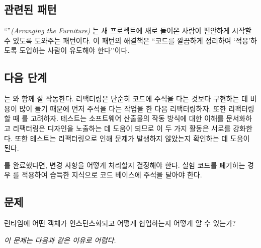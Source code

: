\documentclass[a4paper,10pt,twoside]{book}
\begin{document}
\subsection*{관련된 패턴}

``''\emph{(Arranging the Furniture)} \cite{Tayl00a}는 새 프로젝트에 새로 들어온 사람이 편안하게 시작할 수 있도록 도와주는 패턴이다. 이 패턴의 해결책은 ``코드를 깔끔하게 정리하여 `적응'하도록 도입하는 사람이 유도해야 한다''이다. 

\subsection*{다음 단계}

는 와 함께 잘 작동한다. 리팩터링은 단순히 코드에 주석을 다는 것보다 구현하는 데 비용이 많이 들기 때문에 먼저 주석을 다는 작업을 한 다음 리팩터링하자. 또한 리팩터링할 때 를 고려하자. 테스트는 소프트웨어 산출물의 작동 방식에 대한 이해를 문서화하고 리팩터링은 디자인을 노출하는 데 도움이 되므로 이 두 가지 활동은 서로를 강화한다. 또한 테스트는 리팩터링으로 인해 문제가 발생하지 않았는지 확인하는 데 도움이 된다.

를 완료했다면, 변경 사항을 어떻게 처리할지 결정해야 한다. 실험 코드를 폐기하는 경우 를 적용하여 습득한 지식으로 코드 베이스에 주석을 달아야 한다.




\subsection*{문제}

런타임에 어떤 객체가 인스턴스화되고 어떻게 협업하는지 어떻게 알 수 있는가?

\emph{이 문제는 다음과 같은 이유로 어렵다.}
\end{document}
